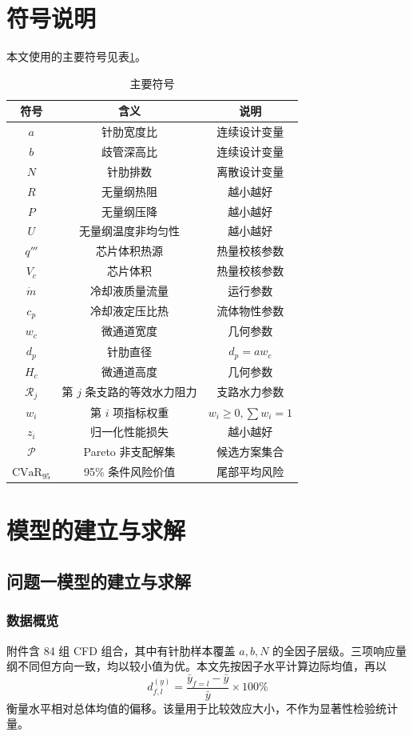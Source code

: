 \documentclass[12pt,a4paper]{article}
\begin{document}
\section{符号说明}
本文使用的主要符号见表\ref{tab:symbols}。
\begin{table}[H]\centering\small\renewcommand{\arraystretch}{1.15}\caption{主要符号}\label{tab:symbols}\begin{tabular}{ccc}\toprule
符号&含义&说明\\\midrule
$a$&针肋宽度比&连续设计变量\\
$b$&歧管深高比&连续设计变量\\
$N$&针肋排数&离散设计变量\\
$R$&无量纲热阻&越小越好\\
$P$&无量纲压降&越小越好\\
$U$&无量纲温度非均匀性&越小越好\\
$q'''$&芯片体积热源&热量校核参数\\
$V_c$&芯片体积&热量校核参数\\
$\dot m$&冷却液质量流量&运行参数\\
$c_p$&冷却液定压比热&流体物性参数\\
$w_c$&微通道宽度&几何参数\\
$d_p$&针肋直径&$d_p=aw_c$\\
$H_c$&微通道高度&几何参数\\
$\mathcal R_j$&第 $j$ 条支路的等效水力阻力&支路水力参数\\
$w_i$&第 $i$ 项指标权重&$w_i\ge0,\sum w_i=1$\\
$z_i$&归一化性能损失&越小越好\\
$\mathcal P$&Pareto 非支配解集&候选方案集合\\
$\mathrm{CVaR}_{95}$&95\% 条件风险价值&尾部平均风险\\\bottomrule
\end{tabular}\end{table}

\section{模型的建立与求解}
\subsection{问题一模型的建立与求解}
\subsubsection{数据概览}
附件含 84 组 CFD 组合，其中有针肋样本覆盖 $a,b,N$ 的全因子层级。三项响应量纲不同但方向一致，均以较小值为优。本文先按因子水平计算边际均值，再以
\begin{equation}d_{f,l}^{(y)}=\frac{\bar y_{f=l}-\bar y}{\bar y}\times100\%\end{equation}
衡量水平相对总体均值的偏移。该量用于比较效应大小，不作为显著性检验统计量。
\end{document}
